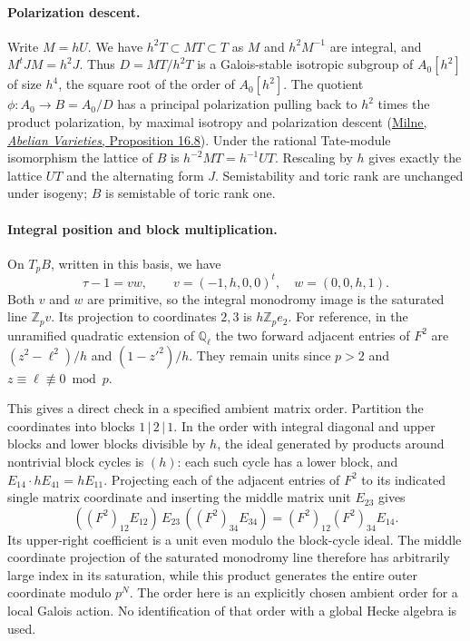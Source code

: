 \documentclass[11pt]{article}
\begin{document}
\paragraph{Polarization descent.}
Write $M=hU$. We have $h^2T\subset MT\subset T$ as $M$ and
$h^2 M^{-1}$ are integral, and $M^tJM=h^2J$.
Thus $D=MT/h^2T$ is a Galois-stable isotropic subgroup of
$A_0[h^2]$ of size $h^4$, the square root of the order of $A_0[h^2]$.
The quotient $\phi:A_0\to B=A_0/D$ has a principal polarization
pulling back to $h^2$ times the product polarization, by maximal
isotropy and polarization descent
(\href{https://www.jmilne.org/math/xnotes/AVs.pdf}{Milne,
\emph{Abelian Varieties}, Proposition 16.8}).
Under the rational Tate-module isomorphism the lattice of $B$ is
$h^{-2}MT=h^{-1}UT$. Rescaling by $h$ gives exactly the lattice
$UT$ and the alternating form $J$. Semistability and toric rank are
unchanged under isogeny; $B$ is semistable of toric rank one.

\paragraph{Integral position and block multiplication.}
On $T_pB$, written in this basis, we have
\[
 \tau-1=v w,\qquad v=(-1,h,0,0)^t,\quad w=(0,0,h,1).
\]
Both $v$ and $w$ are primitive, so the integral monodromy image is
the saturated line $\mathbb Z_p v$. Its projection to coordinates
$2,3$ is $h\mathbb Z_p e_2$. For reference, in the unramified
quadratic extension of $\mathbb Q_\ell$ the two forward adjacent
entries of $F^2$ are $(z^2-\ell^2)/h$ and $(1-z'^2)/h$.
They remain units since $p>2$ and $z\equiv\ell\not\equiv0\bmod p$.

This gives a direct check in a specified ambient matrix order.
Partition the coordinates into blocks $1\,|\,2\,|\,1$. In the order
with integral diagonal and upper blocks and lower blocks divisible
by $h$, the ideal generated by products around nontrivial block
cycles is $(h)$: each such cycle has a lower block, and
$E_{14}\cdot hE_{41}=hE_{11}$. Projecting each of the adjacent
entries of $F^2$ to its indicated single matrix coordinate and
inserting the middle matrix unit $E_{23}$ gives
\[
    ((F^2)_{12}E_{12})\,E_{23}\,((F^2)_{34}E_{34})
      =(F^2)_{12}(F^2)_{34}E_{14}.
\]
Its upper-right coefficient is a unit even modulo the block-cycle
ideal. The middle coordinate projection of the saturated monodromy
line therefore has arbitrarily large index in its saturation, while
this product generates the entire outer coordinate modulo $p^N$.
The order here is an explicitly chosen ambient order for a local
Galois action. No identification of that order with a global Hecke
algebra is used.
\end{document}
